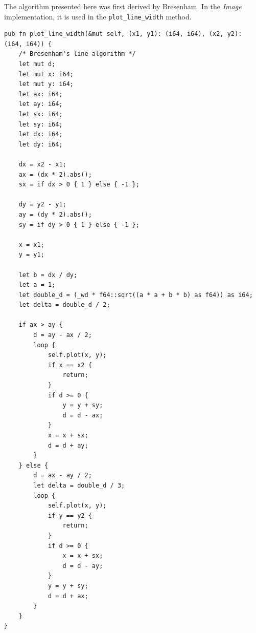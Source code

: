 \documentclass[12pt,a4,oneside,usenames,dvipsnames]{book}
\begin{document}
The algorithm presented here was first derived by Bresenham. In the \emph{Image} implementation, it is used in the \texttt{plot\_line\_width} method.
\begin{verbatim}
pub fn plot_line_width(&mut self, (x1, y1): (i64, i64), (x2, y2): (i64, i64)) {
    /* Bresenham's line algorithm */
    let mut d;
    let mut x: i64;
    let mut y: i64;
    let ax: i64;
    let ay: i64;
    let sx: i64;
    let sy: i64;
    let dx: i64;
    let dy: i64;

    dx = x2 - x1;
    ax = (dx * 2).abs();
    sx = if dx > 0 { 1 } else { -1 };

    dy = y2 - y1;
    ay = (dy * 2).abs();
    sy = if dy > 0 { 1 } else { -1 };

    x = x1;
    y = y1;

    let b = dx / dy;
    let a = 1;
    let double_d = (_wd * f64::sqrt((a * a + b * b) as f64)) as i64;
    let delta = double_d / 2;

    if ax > ay {
        d = ay - ax / 2;
        loop {
            self.plot(x, y);
            if x == x2 {
                return;
            }
            if d >= 0 {
                y = y + sy;
                d = d - ax;
            }
            x = x + sx;
            d = d + ay;
        }
    } else {
        d = ax - ay / 2;
        let delta = double_d / 3;
        loop {
            self.plot(x, y);
            if y == y2 {
                return;
            }
            if d >= 0 {
                x = x + sx;
                d = d - ay;
            }
            y = y + sy;
            d = d + ax;
        }
    }
}
\end{verbatim}
\end{document}
